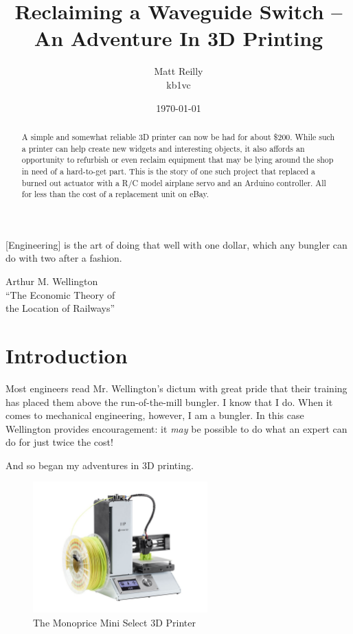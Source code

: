 \documentclass[12pt]{article}
\title{Reclaiming a Waveguide Switch -- An Adventure In 3D Printing}
\author{Matt Reilly  \\
	kb1vc \\
	}
\date{\today}
\begin{document}
\maketitle

\begin{abstract}
  A simple and somewhat reliable 3D printer can now be had for about \$200.
  While such a printer can help create new widgets and interesting objects, 
  it also affords an opportunity to refurbish or even reclaim equipment that
  may be lying around the shop in need of a hard-to-get part. This is the
  story of one such project that replaced a burned out actuator with a
  R/C model airplane servo and an Arduino controller.  All for 
  less than the cost of a replacement unit on eBay.
\end{abstract}

\setlength{\epigraphwidth}{0.8\textwidth}
\epigraph{[Engineering] is the art of doing that well with one dollar,
  which any bungler can do with two after a fashion.}{Arthur M. Wellington \\
  ``The Economic Theory of \\
  the Location of Railways''}





\section{Introduction}

Most engineers read Mr. Wellington's dictum with great pride
that their training has placed them above the run-of-the-mill bungler.
I know that I do.
When it comes to mechanical engineering, however, I am a bungler.
In this case Wellington provides encouragement: it {\em may} be possible
to do what an expert can do for just twice the cost!

And so began my adventures in 3D printing.

\begin{figure}[htb]
  \centering
  \includegraphics[width=0.6\textwidth]{MiniSelect3DPrinter.jpg}
  \caption{\label{f_printer}The Monoprice Mini Select 3D Printer}
\end{figure}
\end{document}
